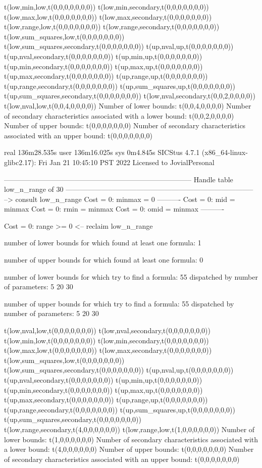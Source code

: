 t(low,min,low,t(0,0,0,0,0,0,0))
t(low,min,secondary,t(0,0,0,0,0,0,0))
t(low,max,low,t(0,0,0,0,0,0,0))
t(low,max,secondary,t(0,0,0,0,0,0,0))
t(low,range,low,t(0,0,0,0,0,0,0))
t(low,range,secondary,t(0,0,0,0,0,0,0))
t(low,sum_squares,low,t(0,0,0,0,0,0,0))
t(low,sum_squares,secondary,t(0,0,0,0,0,0,0))
t(up,nval,up,t(0,0,0,0,0,0,0))
t(up,nval,secondary,t(0,0,0,0,0,0,0))
t(up,min,up,t(0,0,0,0,0,0,0))
t(up,min,secondary,t(0,0,0,0,0,0,0))
t(up,max,up,t(0,0,0,0,0,0,0))
t(up,max,secondary,t(0,0,0,0,0,0,0))
t(up,range,up,t(0,0,0,0,0,0,0))
t(up,range,secondary,t(0,0,0,0,0,0,0))
t(up,sum_squares,up,t(0,0,0,0,0,0,0))
t(up,sum_squares,secondary,t(0,0,0,0,0,0,0))
t(low,nval,secondary,t(0,0,2,0,0,0,0))
t(low,nval,low,t(0,0,4,0,0,0,0))
Number of lower bounds:                                             t(0,0,4,0,0,0,0)
Number of secondary characteristics associated with a lower bound:  t(0,0,2,0,0,0,0)
Number of upper bounds:                                             t(0,0,0,0,0,0,0)
Number of secondary characteristics associated with an upper bound: t(0,0,0,0,0,0,0)

real	136m28.535s
user	136m16.025s
sys	0m4.845s
SICStus 4.7.1 (x86_64-linux-glibc2.17): Fri Jan 21 10:45:10 PST 2022
Licensed to JovialPersonal


--------------------------------------------------------------------------------
Handle table low_n_range of 30
--------------------------------------------------------------------------------
--> consult low_n_range
Cost =  0:  minmax = 0
----------
Cost =  0:  mid    = minmax
Cost =  0:  rmin   = minmax
Cost =  0:  omid   = minmax
----------

Cost =  0:  range >= 0
<-- reclaim low_n_range

number of lower bounds for which found at least one formula: 1

number of upper bounds for which found at least one formula: 0

number of lower bounds for which try to find a formula: 55
dispatched by number of parameters: 5  20  30

number of upper bounds for which try to find a formula: 55
dispatched by number of parameters: 5  20  30

t(low,nval,low,t(0,0,0,0,0,0,0))
t(low,nval,secondary,t(0,0,0,0,0,0,0))
t(low,min,low,t(0,0,0,0,0,0,0))
t(low,min,secondary,t(0,0,0,0,0,0,0))
t(low,max,low,t(0,0,0,0,0,0,0))
t(low,max,secondary,t(0,0,0,0,0,0,0))
t(low,sum_squares,low,t(0,0,0,0,0,0,0))
t(low,sum_squares,secondary,t(0,0,0,0,0,0,0))
t(up,nval,up,t(0,0,0,0,0,0,0))
t(up,nval,secondary,t(0,0,0,0,0,0,0))
t(up,min,up,t(0,0,0,0,0,0,0))
t(up,min,secondary,t(0,0,0,0,0,0,0))
t(up,max,up,t(0,0,0,0,0,0,0))
t(up,max,secondary,t(0,0,0,0,0,0,0))
t(up,range,up,t(0,0,0,0,0,0,0))
t(up,range,secondary,t(0,0,0,0,0,0,0))
t(up,sum_squares,up,t(0,0,0,0,0,0,0))
t(up,sum_squares,secondary,t(0,0,0,0,0,0,0))
t(low,range,secondary,t(4,0,0,0,0,0,0))
t(low,range,low,t(1,0,0,0,0,0,0))
Number of lower bounds:                                             t(1,0,0,0,0,0,0)
Number of secondary characteristics associated with a lower bound:  t(4,0,0,0,0,0,0)
Number of upper bounds:                                             t(0,0,0,0,0,0,0)
Number of secondary characteristics associated with an upper bound: t(0,0,0,0,0,0,0)

